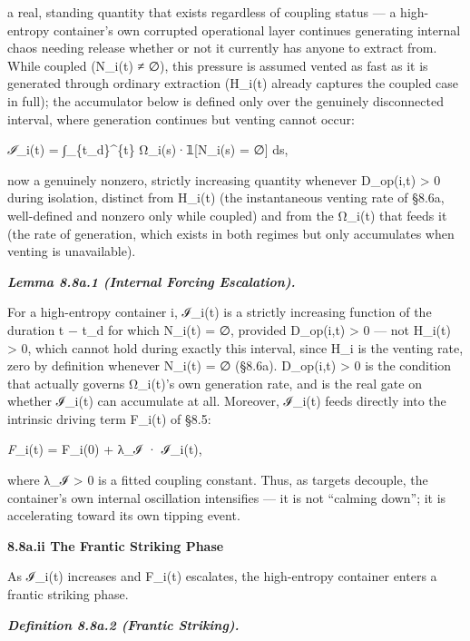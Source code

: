 \documentclass[
]{article}
\begin{document}
a real, standing quantity that exists regardless of coupling status ---
a high-entropy container's own corrupted operational layer continues
generating internal chaos needing release whether or not it currently
has anyone to extract from. While coupled (N\_i(t) ≠ ∅), this pressure
is assumed vented as fast as it is generated through ordinary extraction
(H\_i(t) already captures the coupled case in full); the accumulator
below is defined only over the genuinely disconnected interval, where
generation continues but venting cannot occur:

\emph{ℐ}\_i(t) = ∫\_\{t\_d\}\^{}\{t\} Ω\_i(s)·𝟙{[}N\_i(s) = ∅{]} ds,

now a genuinely nonzero, strictly increasing quantity whenever
D\_op(i,t) \textgreater{} 0 during isolation, distinct from H\_i(t) (the
instantaneous venting rate of §8.6a, well-defined and nonzero only while
coupled) and from the Ω\_i(t) that feeds it (the rate of generation,
which exists in both regimes but only accumulates when venting is
unavailable).

\emph{\textbf{Lemma 8.8a.1 (Internal Forcing Escalation).}}

For a high-entropy container i, ℐ\_i(t) is a strictly increasing
function of the duration t − t\_d for which N\_i(t) = ∅, provided
D\_op(i,t) \textgreater{} 0 --- not H\_i(t) \textgreater{} 0, which
cannot hold during exactly this interval, since H\_i is the venting
rate, zero by definition whenever N\_i(t) = ∅ (§8.6a). D\_op(i,t)
\textgreater{} 0 is the condition that actually governs Ω\_i(t)'s own
generation rate, and is the real gate on whether ℐ\_i(t) can accumulate
at all. Moreover, ℐ\_i(t) feeds directly into the intrinsic driving term
F\_i(t) of §8.5:

\emph{F}\_i(t) = F\_i(0) + λ\_ℐ · ℐ\_i(t),

where λ\_ℐ \textgreater{} 0 is a fitted coupling constant. Thus, as
targets decouple, the container's own internal oscillation intensifies
--- it is not ``calming down''; it is accelerating toward its own
tipping event.

\textbf{8.8a.ii The Frantic Striking Phase}

As ℐ\_i(t) increases and F\_i(t) escalates, the high-entropy container
enters a frantic striking phase.

\emph{\textbf{Definition 8.8a.2 (Frantic Striking).}}
\end{document}
